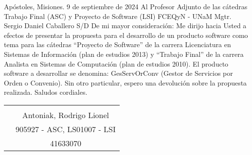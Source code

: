 \null\hfill
\normalsize{
Ap\'ostoles, Misiones. 9 de septiembre de 2024
}
\vspace{0.5cm}
\newline
\normalsize{
Al Profesor Adjunto de las c\'atedras
}
\newline
\normalsize{
Trabajo Final (ASC) y Proyecto de Software (LSI)
}
\newline
\normalsize{
FCEQyN - UNaM
}
\newline
\normalsize{
Mgtr. Sergio Daniel Caballero
}
\newline
\normalsize{
S/D
}
\vspace{0.5cm}
\newline
\normalsize{
De mi mayor consideración:
}
\vspace{0.5cm}
\newline
\setlength\parindent{5.5cm}
\normalsize{ \indent
Me dirijo hacia Usted a efectos de presentar la
propuesta para el desarrollo de un producto software
como tema para las c\'atedras “Proyecto de Software”
de la carrera Licenciatura en Sistemas de Informaci\'on
(plan de estudios 2013) y “Trabajo Final” de la carrera
Analista en Sistemas de Computaci\'on (plan de estudios
2010).
}
\newline
\normalsize{ \indent
El producto software a desarrollar se denomina:
GesServOrConv (Gestor de Servicios por Orden o Convenio).
}
\newline
\normalsize{ \indent
Sin otro particular, espero una devoluci\'on sobre la
propuesta realizada. Saludos cordiales.
}
\vspace{5cm}
\newline
\setlength\parindent{0.5cm}
\begin{tabular}{ p{7cm} c }
	\vspace{0.25cm} & \underline{\hspace{6cm}} \\ 
	\vspace{0.25cm} & Antoniak, Rodrigo Lionel \\ 
	\vspace{0.25cm} & 905927 - ASC, LS01007 - LSI \\  
	\vspace{0.25cm} & 41633070
\end{tabular}
